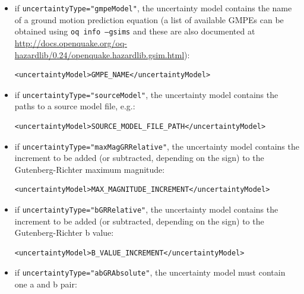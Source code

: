 \begin{itemize}

    \item if \Verb+uncertaintyType="gmpeModel"+, the uncertainty model
	contains the name of a ground motion prediction equation (a list of
	available GMPEs can be obtained using \texttt{oq info --gsims} and these
	are also documented at
	\href{http://docs.openquake.org/oq-hazardlib/0.24/openquake.hazardlib.gsim.html}{http://docs.openquake.org/oq-hazardlib/0.24/openquake.hazardlib.gsim.html}):

    \begin{verbatim}
<uncertaintyModel>GMPE_NAME</uncertaintyModel>
	\end{verbatim}

    \item if \Verb+uncertaintyType="sourceModel"+, the uncertainty model
	contains the paths to a source model file, e.g.:

    \begin{verbatim}
<uncertaintyModel>SOURCE_MODEL_FILE_PATH</uncertaintyModel>
	\end{verbatim}

    \item if \Verb+uncertaintyType="maxMagGRRelative"+, the uncertainty model
	contains the increment to be added (or subtracted, depending on the sign)
	to the Gutenberg-Richter maximum magnitude:

    \begin{verbatim}
<uncertaintyModel>MAX_MAGNITUDE_INCREMENT</uncertaintyModel>
	\end{verbatim}

    \item if \Verb+uncertaintyType="bGRRelative"+, the uncertainty model
	contains the increment to be added (or subtracted, depending on the sign)
	to the Gutenberg-Richter b value:

    \begin{verbatim}
<uncertaintyModel>B_VALUE_INCREMENT</uncertaintyModel>
	\end{verbatim}

    \item if \Verb+uncertaintyType="abGRAbsolute"+, the uncertainty model
	must contain one a and b pair:


\end{itemize}
